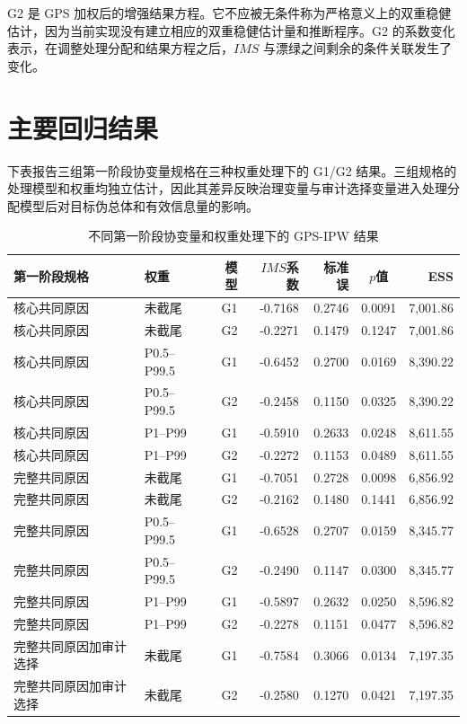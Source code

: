 \documentclass[11pt]{article}
\begin{document}
G2 是 GPS 加权后的增强结果方程。它不应被无条件称为严格意义上的双重稳健估计，因为当前实现没有建立相应的双重稳健估计量和推断程序。G2 的系数变化表示，在调整处理分配和结果方程之后，$IMS$ 与漂绿之间剩余的条件关联发生了变化。

\section{主要回归结果}

下表报告三组第一阶段协变量规格在三种权重处理下的 G1/G2 结果。三组规格的处理模型和权重均独立估计，因此其差异反映治理变量与审计选择变量进入处理分配模型后对目标伪总体和有效信息量的影响。

\begin{table}[htbp]
\centering
\begin{threeparttable}
\caption{不同第一阶段协变量和权重处理下的 GPS-IPW 结果}
\scriptsize
\begin{tabular}{llrrrcr}
\toprule
第一阶段规格 & 权重 & 模型 & $IMS$系数 & 标准误 & $p$值 & ESS \\
\midrule
核心共同原因 & 未截尾 & G1 & -0.7168 & 0.2746 & 0.0091 & 7,001.86 \\
核心共同原因 & 未截尾 & G2 & -0.2271 & 0.1479 & 0.1247 & 7,001.86 \\
核心共同原因 & P0.5--P99.5 & G1 & -0.6452 & 0.2700 & 0.0169 & 8,390.22 \\
核心共同原因 & P0.5--P99.5 & G2 & -0.2458 & 0.1150 & 0.0325 & 8,390.22 \\
核心共同原因 & P1--P99 & G1 & -0.5910 & 0.2633 & 0.0248 & 8,611.55 \\
核心共同原因 & P1--P99 & G2 & -0.2272 & 0.1153 & 0.0489 & 8,611.55 \\
\midrule
完整共同原因 & 未截尾 & G1 & -0.7051 & 0.2728 & 0.0098 & 6,856.92 \\
完整共同原因 & 未截尾 & G2 & -0.2162 & 0.1480 & 0.1441 & 6,856.92 \\
完整共同原因 & P0.5--P99.5 & G1 & -0.6528 & 0.2707 & 0.0159 & 8,345.77 \\
完整共同原因 & P0.5--P99.5 & G2 & -0.2490 & 0.1147 & 0.0300 & 8,345.77 \\
完整共同原因 & P1--P99 & G1 & -0.5897 & 0.2632 & 0.0250 & 8,596.82 \\
完整共同原因 & P1--P99 & G2 & -0.2278 & 0.1151 & 0.0477 & 8,596.82 \\
\midrule
完整共同原因加审计选择 & 未截尾 & G1 & -0.7584 & 0.3066 & 0.0134 & 7,197.35 \\
完整共同原因加审计选择 & 未截尾 & G2 & -0.2580 & 0.1270 & 0.0421 & 7,197.35 \\

\end{tabular}
\end{threeparttable}
\end{table}
\end{document}
